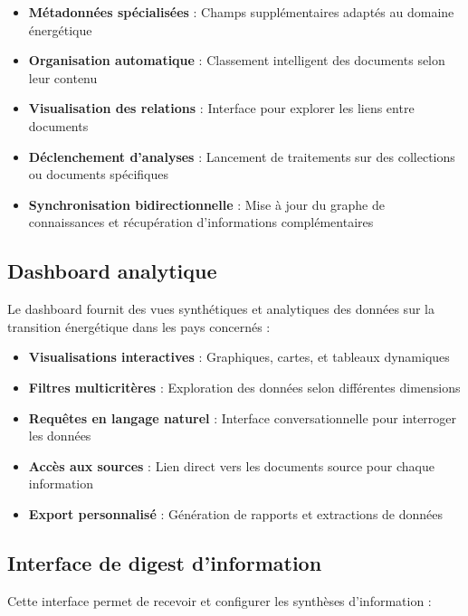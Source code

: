 \documentclass[a4paper,11pt]{report}
\providecommand{\tightlist}{\setlength{\itemsep}{0pt}\setlength{\parskip}{0pt}}
\begin{document}
\begin{itemize}
\tightlist
\item
  \textbf{Métadonnées spécialisées} : Champs supplémentaires adaptés au domaine énergétique
\item
  \textbf{Organisation automatique} : Classement intelligent des documents selon leur contenu
\item
  \textbf{Visualisation des relations} : Interface pour explorer les liens entre documents
\item
  \textbf{Déclenchement d'analyses} : Lancement de traitements sur des collections ou documents spécifiques
\item
  \textbf{Synchronisation bidirectionnelle} : Mise à jour du graphe de connaissances et récupération d'informations complémentaires
\end{itemize}

\subsection{Dashboard analytique}\label{dashboard-analytique}

Le dashboard fournit des vues synthétiques et analytiques des données sur la transition énergétique dans les pays concernés :

\begin{itemize}
\tightlist
\item
  \textbf{Visualisations interactives} : Graphiques, cartes, et tableaux dynamiques
\item
  \textbf{Filtres multicritères} : Exploration des données selon différentes dimensions
\item
  \textbf{Requêtes en langage naturel} : Interface conversationnelle pour interroger les données
\item
  \textbf{Accès aux sources} : Lien direct vers les documents source pour chaque information
\item
  \textbf{Export personnalisé} : Génération de rapports et extractions de données
\end{itemize}

\subsection{Interface de digest d'information}\label{interface-de-digest-dinformation}

Cette interface permet de recevoir et configurer les synthèses d'information :
\end{document}

